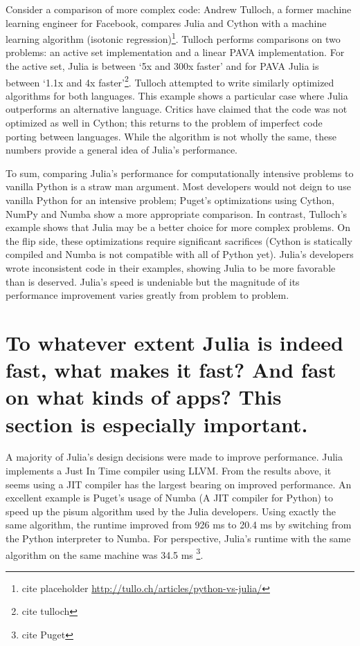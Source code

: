 \documentclass[10pt]{article}
\begin{document}
Consider a comparison of more complex code: Andrew Tulloch, a former machine learning engineer for Facebook, compares Julia and Cython with a machine learning algorithm (isotonic regression)\footnote{cite placeholder \url{http://tullo.ch/articles/python-vs-julia/}}. Tulloch performs comparisons on two problems: an active set implementation and a linear PAVA implementation. For the active set, Julia is between `5x and 300x faster' and for PAVA Julia is between `1.1x and 4x faster'\footnote{cite tulloch}. Tulloch attempted to write similarly optimized algorithms for both languages. This example shows a particular case where Julia outperforms an alternative language. Critics have claimed that the code was not optimized as well in Cython; this returns to the problem of imperfect code porting between languages. While the algorithm is not wholly the same, these numbers provide a general idea of Julia's performance.

To sum, comparing Julia's performance for computationally intensive problems to vanilla Python is a straw man argument. Most developers would not deign to use vanilla Python for an intensive problem; Puget's optimizations using Cython, NumPy and Numba show a more appropriate comparison. In contrast, Tulloch's example shows that Julia may be a better choice for more complex problems. On the flip side, these optimizations require significant sacrifices (Cython is statically compiled and Numba is not compatible with all of Python yet). Julia's developers wrote inconsistent code in their examples, showing Julia to be more favorable than is deserved. Julia's speed is undeniable but the magnitude of its performance improvement varies greatly from problem to problem.

\section*{\normalsize To whatever extent Julia is indeed fast, what makes it fast? And fast on what kinds of apps?
This section is especially important.}

A majority of Julia's design decisions were made to improve performance. Julia implements a Just In Time compiler using LLVM. From the results above, it seems using a JIT compiler has the largest bearing on improved performance. An excellent example is Puget's usage of Numba (A JIT compiler for Python) to speed up the pisum algorithm used by the Julia developers. Using exactly the same algorithm, the runtime improved from 926 ms to 20.4 ms by switching from the Python interpreter to Numba. For perspective, Julia's runtime with the same algorithm on the same machine was 34.5 ms \footnote{cite Puget}.
\end{document}
